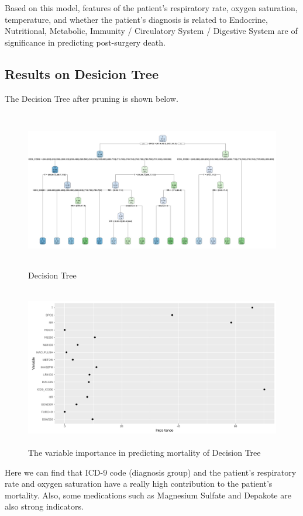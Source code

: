 \documentclass[twoside,11pt]{article}
\begin{document}
Based on this model, features of the patient's respiratory rate, oxygen saturation, temperature, and whether the patient's diagnosis is related to Endocrine, Nutritional, Metabolic, Immunity / Circulatory System / Digestive System are of significance in predicting post-surgery death.

\subsection{Results on Desicion Tree} 
The Decision Tree after pruning is shown below.

\begin{figure}[htbp]
  \centering 
  \includegraphics[height=7cm, width=14cm]{fig6} 
  \caption{Decision Tree}
  \label{fig6} 
\end{figure} 

\begin{figure}[htbp]
  \centering 
  \includegraphics[height=7cm, width=14cm]{fig7} 
  \caption{The variable importance in predicting mortality of Decision Tree}
  \label{fig7} 
\end{figure} 

Here we can find that ICD-9 code (diagnosis group) and the patient's respiratory rate and oxygen saturation have a really high contribution to the patient's mortality. Also, some medications such as Magnesium Sulfate and Depakote are also strong indicators.
\end{document}

